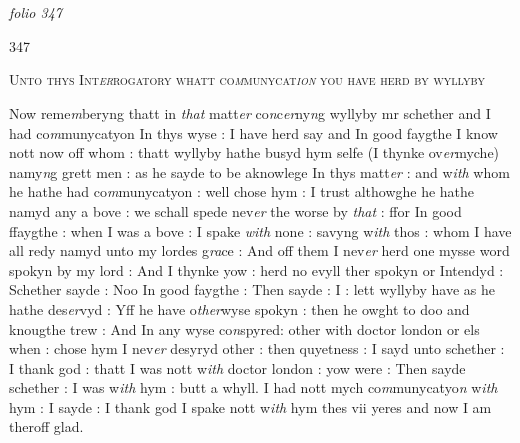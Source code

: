\documentclass[12pt, a4paper]{book}
\begin{document}
\dotfill
						\newpage {} \section*{}  \subsection*{}

\textit{folio 347}



\begin{flushright}{\color{Mahogany}347}\end{flushright}

				\begin{center} \begin{large} {\scshape Unto thys Int\textit{er}rogatory 
whatt co\textit{m}munycat\textit{ion} you have herd
by wyllyby} \end{large} \end{center}
			


		\ifthenelse{\isodd{\thepage}}
		{\reversemarginpar}
		{\normalmarginpar}
		Now reme\textit{m}beryng thatt in \textit{that }matt\textit{er} co\textit{n}c\textit{er}ny\textit{n}g wyllyby mr schether and I
had co\textit{m}munycatyon In thys wyse : I have herd say and In good
faygthe I know nott now off whom : thatt wyllyby hathe
busyd hym selfe (I thynke ov\textit{er}myche) namy\textit{n}g grett men : as he
sayde to be aknowlege In thys matt\textit{er} : and w\textit{ith} whom he hathe
had co\textit{m}munycatyon : well chose hym : I trust althowghe he hathe
namyd any a bove : we schall spede nev\textit{er} the worse by \textit{that} : ffor
In good ffaygthe : when I was a bove : I spake \textit{with} none : savyng
w\textit{ith }thos : whom I have all redy namyd unto my lordes g\textit{ra}ce  : And 
off them I nev\textit{er} herd one mysse word spokyn by my lord : And 
I thynke yow : herd no evyll ther spokyn or Intendyd : Schether
sayde : Noo In good faygthe : Then sayde : I : lett wyllyby have
as he hathe des\textit{er}vyd : Yff he have o\textit{ther}wyse spokyn : then he owght
to doo and knougthe trew : And In any wyse co\textit{n}spyred: other with doctor london or els when
			 : chose hym 
I nev\textit{er} desyryd other : then quyetness : I sayd unto schether : I 
thank god : thatt I was nott w\textit{ith} doctor london : yow were : Then 
sayde schether : I was w\textit{ith} hym : butt a whyll. I had nott mych
co\textit{m}munycatyo\textit{n} w\textit{ith} hym : I sayde : I thank god I spake nott w\textit{ith} hym
thes vii yeres and now I am theroff glad.
\end{document}
